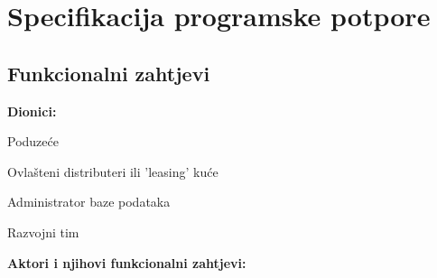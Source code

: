 \chapter{Specifikacija programske potpore}
		
	\section{Funkcionalni zahtjevi}
			
			
			

			
			\noindent \textbf{Dionici:}
			
			\begin{packed_enum}
				
				\item Poduzeće
				\item Ovlašteni distributeri ili 'leasing' kuće				
				\item Administrator baze podataka
				\item Razvojni tim
				
			\end{packed_enum}
			
			\noindent \textbf{Aktori i njihovi funkcionalni zahtjevi:}
			
